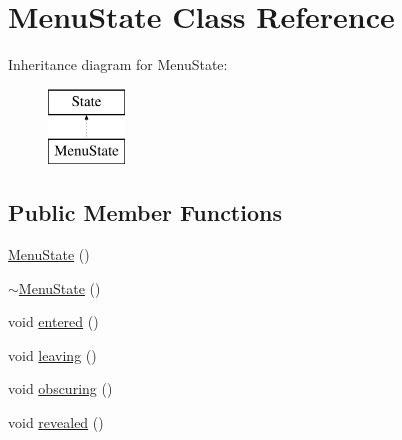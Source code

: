 \hypertarget{class_menu_state}{\section{Menu\+State Class Reference}
\label{class_menu_state}
}
Inheritance diagram for Menu\+State\+:\begin{figure}[H]
\begin{center}
\leavevmode
\includegraphics[height=2.000000cm]{class_menu_state}
\end{center}
\end{figure}
\subsection*{Public Member Functions}
\begin{DoxyCompactItemize}
\item 
\hyperlink{class_menu_state_aa8c0b7495397c6c46d137f6c5b3167d3}{Menu\+State} ()
\item 
\hyperlink{class_menu_state_a58aea91a44436c5bba575c5de755a5bc}{$\sim$\+Menu\+State} ()
\item 
void \hyperlink{class_menu_state_a46418226e09211231edd8aec9cb339c9}{entered} ()
\item 
void \hyperlink{class_menu_state_a76cb5a0029b67ea326afd46f7f11a6df}{leaving} ()
\item 
void \hyperlink{class_menu_state_a457fc15afc90cf97b8a7bba4ee946fc7}{obscuring} ()
\item 
void \hyperlink{class_menu_state_adf42864e4f79ee30d23d1b54847b8dfc}{revealed} ()
\end{DoxyCompactItemize}


